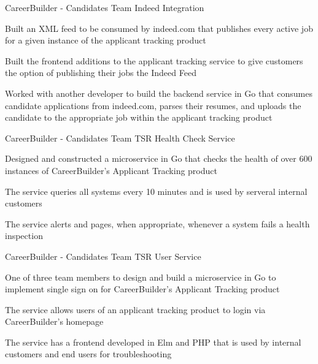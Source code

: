 \begin{cventries}
\cventry
{CareerBuilder - Candidates Team} %
{Indeed Integration} %
{} %
{} %
{
	\begin{cvitems} %
		\item {Built an XML feed to be consumed by indeed.com that publishes every active job for a given instance of the applicant tracking product}  
		\item {Built the frontend additions to the applicant tracking service to give customers the option of publishing their jobs the Indeed Feed}
		\item {Worked with another developer to build the backend service in Go that consumes candidate applications from indeed.com, parses their resumes, and uploads the candidate to the appropriate job within the applicant tracking product} 
	\end{cvitems}
}


\cventry
  	{CareerBuilder - Candidates Team} %
    {TSR Health Check Service} %
    {} %
    {} %
    {
      \begin{cvitems} %
        \item {Designed and constructed a microservice in Go that checks the health of over 600 instances of CareerBuilder's Applicant Tracking product}  
        \item {The service queries all systems every 10 minutes and is used by serveral internal customers}
        \item {The service alerts and pages, when appropriate, whenever a system fails a health inspection} 
      \end{cvitems}
    }


\cventry
  	{CareerBuilder - Candidates Team} %
    {TSR User Service} %
    {} %
    {} %
    {
      \begin{cvitems} %
        \item {One of three team members to design and build a microservice in Go to implement single sign on for CareerBuilder's Applicant Tracking product}  
        \item {The service allows users of an applicant tracking product to login via CareerBuilder's homepage}
        \item {The service has a frontend developed in Elm and PHP that is used by internal customers and end users for troubleshooting} 
      \end{cvitems}
    }


\end{cventries}
